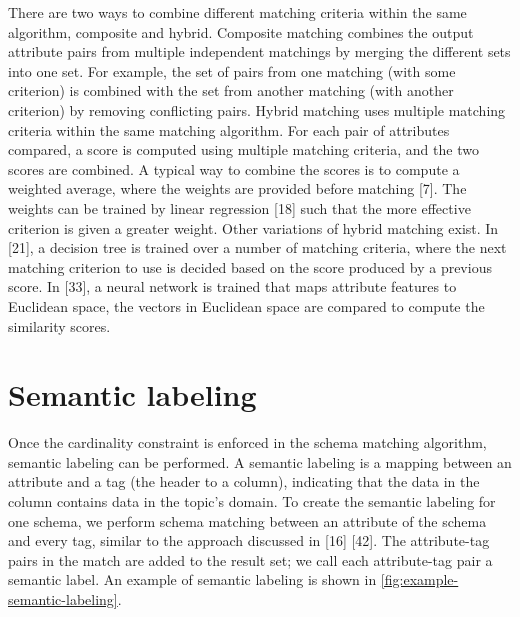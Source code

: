 There are two ways to combine different matching criteria within the same algorithm, composite and hybrid. Composite matching combines the output attribute pairs from multiple independent matchings by merging the different sets into one set. For example, the set of pairs from one matching (with some criterion) is combined with the set from another matching (with another criterion) by removing conflicting pairs. Hybrid matching uses multiple matching criteria within the same matching algorithm. For each pair of attributes compared, a score is computed using multiple matching criteria, and the two scores are combined. A typical way to combine the scores is to compute a weighted average, where the weights are provided before matching \cite{DBLP:journals/debu/ChenGHTD18}[7]. The weights can be trained by linear regression \cite{Ehrig2004QOM}[18] such that the more effective criterion is given a greater weight. Other variations of hybrid matching exist. In \cite{Giunchiglia2005Semantic}[21], a decision tree is trained over a number of matching criteria, where the next matching criterion to use is decided based on the score produced by a previous score. In \cite{Moawed2018Arabian}[33], a neural network is trained that maps attribute features to Euclidean space, the vectors in Euclidean space are compared to compute the similarity scores.

\section{Semantic labeling}
\label{sec:SemanticLabeling}

Once the cardinality constraint is enforced in the schema matching algorithm, semantic labeling can be performed. A semantic labeling is a mapping between an attribute and a tag (the header to a column), indicating that the data in the column contains data in the topic's domain. To create the semantic labeling for one schema, we perform schema matching between an attribute of the schema and every tag, similar to the approach discussed in \cite{Dong2012Proceedings}[16] \cite{Salakhutdinov2009Semantic}[42]. The attribute-tag pairs in the match are added to the result set; we call each attribute-tag pair a semantic label. An example of semantic labeling is shown in \autoref{fig:example-semantic-labeling}.

